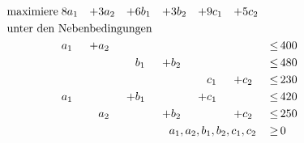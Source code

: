 \documentclass[10pt,a4paper,oneside,ngerman,numbers=noenddot]{scrartcl}
\begin{document}
	\subsection{} %
		\begin{alignat*}{7}
		\text{maximiere}\; & 8a_{1} &+& 3a_{2} &+& 6b_{1} &+& 3b_{2} &+& 9c_{1} &+& 5c_{2} &&  \\
		\multicolumn{14}{l}{\text{unter den Nebenbedingungen}} && \\
		& a_{1} &+& a_{2} && && && && &\leq &\, 400 \\
		& && && b_{1} &+& b_{2} && && &\leq &\, 480 \\
		& && && && && c_{1} &+& c_{2} &\leq &\, 230 \\
		& a_{1} && &+& b_{1} && &+& c_{1} && &\leq &\, 420 \\
		& && a_{2} && &+& b_{2} && &+& c_{2} &\leq &\, 250 \\
		\multicolumn{12}{r}{$a_{1}, a_{2}, b_{1}, b_{2}, c_{1}, c_{2}$} \,&\geq &\, 0
		\end{alignat*}
\end{document}
